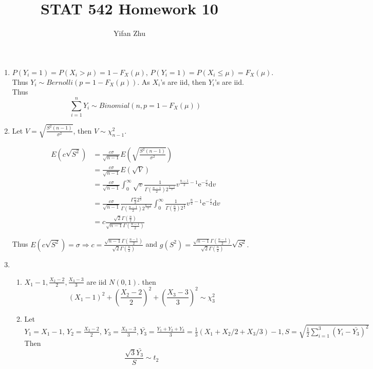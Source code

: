 \documentclass{article}
\begin{document}
	

	
	\title{STAT 542 Homework 10}
	\author{Yifan Zhu}
	\maketitle
	
	\begin{enumerate}[leftmargin = 0 em, label = \arabic*., font = \bfseries]
	\item 
	$P(Y_i = 1) = P(X_i > \mu) = 1 - F_X (\mu),\, P(Y_i = 1) = P(X_i \leq \mu ) = F_X (\mu).$ Thus $Y_i \sim Bernolli(p = 1 - F_X (\mu))$. As $X_i$'s are iid, then $Y_i$'s are iid. Thus
	\[\sum_{i=1 }^n Y_i \sim Binomial(n, p = 1 - F_X (\mu))\]


	\item 
	Let $V = \sqrt{\frac{S^2 (n-1)}{\sigma^2}}$, then $V \sim \chi^2_{n-1}$. 

	\begin{align*}
	E(c \sqrt{S^2}) & = \frac{c \sigma}{\sqrt{n-1}}E\left(\sqrt{\frac{S^2 (n-1)}{\sigma^2}}\right)\\
	& = \frac{c \sigma}{\sqrt{n-1}} E(\sqrt{V})\\
	& = \frac{c \sigma}{\sqrt{n-1}} \int_{0}^\infty \sqrt{v}\frac{1}{\Gamma(\frac{n-1}{2}) 2^{\frac{n-1}{2}}} v^{\frac{n-1}{2} -1} \mathrm{e}^{- \frac{v}{2}} \mathrm{d}v\\
	& = \frac{c \sigma}{\sqrt{n-1}}  \frac{\Gamma{\frac{n}{2}} 2^{\frac{n}{2}}}{\Gamma(\frac{n-1}{2}) 2^{\frac{n-1}{2}}}\int_{0}^\infty \frac{1}{\Gamma(\frac{n}{2}) 2^{\frac{n}{2}}} v^{\frac{n}{2} - 1} \mathrm{e}^{- \frac{v}{2}} \mathrm{d}v\\
	& = c \frac{\sqrt{2} \Gamma(\frac{n}{2})}{\sqrt{n-1} \Gamma(\frac{n-1}{2})}
	\end{align*}

	Thus $E(c \sqrt{S^2}) = \sigma \Rightarrow c = \frac{\sqrt{n-1}\Gamma(\frac{n-1}{2})}{\sqrt{2} \Gamma(\frac{n}{2})}$ and $g(S^2) = \frac{\sqrt{n-1}\Gamma(\frac{n-1}{2})}{\sqrt{2} \Gamma(\frac{n}{2})} \sqrt{S^2}.$


	\item 
	\begin{enumerate}
		\item 
		$X_1 - 1, \frac{X_2 - 2}{2}, \frac{X_3 - 3}{3}$ are iid $N(0,1)$. then
		\[(X_1 -1)^2 + \left(\frac{X_2 - 2}{2}\right)^2 + \left(\frac{X_3 - 3}{3}\right)^2 \sim \chi^2_{3} \]


		\item 
		Let $Y_1 = X_1 - 1,\, Y_2 = \frac{X_2 - 2}{2},\, Y_3 = \frac{X_3 - 3}{3}, \bar{Y_3} = \frac{Y_1 + Y_2 + Y_3}{3} = \frac{1}{3}(X_1 + X_2/2 + X_3 /3) - 1, S = \sqrt{\frac{1}{2}\sum_{i = 1}^3 (Y_i - \bar{Y_3})^2}$ Then
		\[\frac{\sqrt{3} \bar{Y_3}}{S} \sim t_{2}\] 


\end{enumerate}
\end{enumerate}
\end{document}
